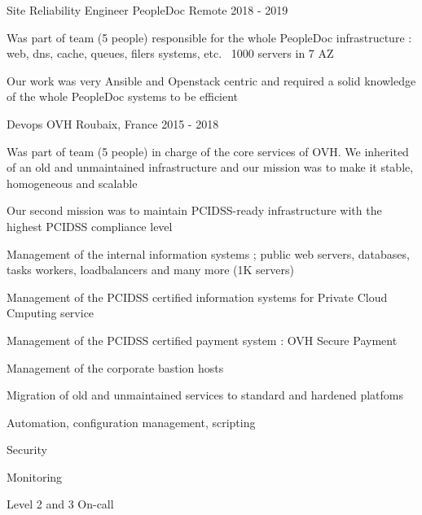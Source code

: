 \begin{cventries}

\cventry
{Site Reliability Engineer} %
{PeopleDoc} %
{Remote} %
{2018 - 2019} %
{ %
\begin{cvitems}
\item {Was part of team (5 people) responsible for the whole PeopleDoc infrastructure : web, dns, cache, queues, filers systems, etc. ~1000 servers in 7 AZ}
\item {Our work was very Ansible and Openstack centric and required a solid knowledge of the whole PeopleDoc systems to be efficient}
\end{cvitems}
}


\cventry
{Devops} %
{OVH} %
{Roubaix, France} %
{2015 - 2018} %
{ %
\begin{cvitems}
\item {Was part of team (5 people) in charge of the core services of OVH. We inherited of an old and unmaintained infrastructure and our mission was to make it stable, homogeneous and scalable}
\item {Our second mission was to maintain PCIDSS-ready infrastructure with the highest PCIDSS compliance level}
\item {Management of the internal information systems ; public web servers, databases, tasks workers, loadbalancers and many more (1K servers)}
\item {Management of the PCIDSS certified information systems for Private Cloud Cmputing service}
\item {Management of the PCIDSS certified payment system : OVH Secure Payment}
\item {Management of the corporate bastion hosts}
\item {Migration of old and unmaintained services to standard and hardened platfoms}
\item {Automation, configuration management, scripting}
\item {Security}
\item {Monitoring}
\item {Level 2 and 3 On-call}
\end{cvitems}
}



\end{cventries}
